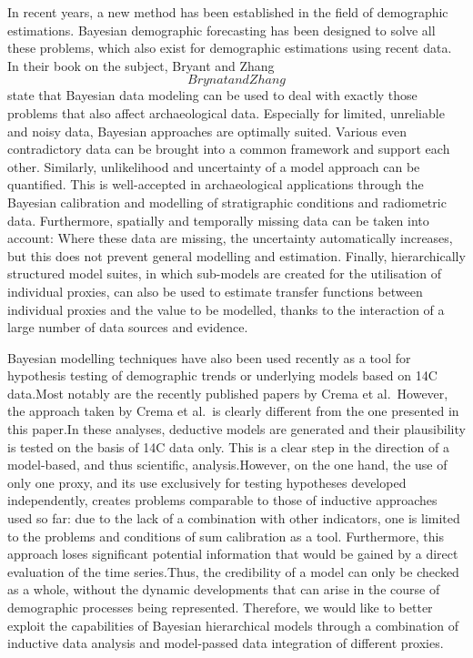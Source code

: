 \documentclass[
]{article}
\begin{document}
In recent years, a new method has been established in the field of demographic estimations. Bayesian demographic forecasting has been designed to solve all these problems, which also exist for demographic estimations using recent data. In their book on the subject, Bryant and Zhang \[BrynatandZhang\] state that Bayesian data modeling can be used to deal with exactly those problems that also affect archaeological data. Especially for limited, unreliable and noisy data, Bayesian approaches are optimally suited. Various even contradictory data can be brought into a common framework and support each other. Similarly, unlikelihood and uncertainty of a model approach can be quantified. This is well-accepted in archaeological applications through the Bayesian calibration and modelling of stratigraphic conditions and radiometric data. Furthermore, spatially and temporally missing data can be taken into account: Where these data are missing, the uncertainty automatically increases, but this does not prevent general modelling and estimation. Finally, hierarchically structured model suites, in which sub-models are created for the utilisation of individual proxies, can also be used to estimate transfer functions between individual proxies and the value to be modelled, thanks to the interaction of a large number of data sources and evidence.

Bayesian modelling techniques have also been used recently as a tool for hypothesis testing of demographic trends or underlying models based on 14C data.Most notably are the recently published papers by Crema et al.~However, the approach taken by Crema et al.~is clearly different from the one presented in this paper.In these analyses, deductive models are generated and their plausibility is tested on the basis of 14C data only. This is a clear step in the direction of a model-based, and thus scientific, analysis.However, on the one hand, the use of only one proxy, and its use exclusively for testing hypotheses developed independently, creates problems comparable to those of inductive approaches used so far: due to the lack of a combination with other indicators, one is limited to the problems and conditions of sum calibration as a tool. Furthermore, this approach loses significant potential information that would be gained by a direct evaluation of the time series.Thus, the credibility of a model can only be checked as a whole, without the dynamic developments that can arise in the course of demographic processes being represented. Therefore, we would like to better exploit the capabilities of Bayesian hierarchical models through a combination of inductive data analysis and model-passed data integration of different proxies.
\end{document}
